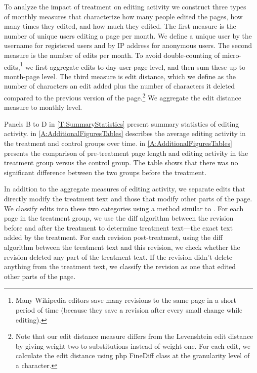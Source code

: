\documentclass[12pt]{article}
\begin{document}
To analyze the impact of treatment on editing activity we construct three types of monthly measures that characterize how many people edited the pages, how many times they edited, and how much they edited. The first measure is the number of unique users editing a page per month. We define a unique user by the username for registered users and by IP address for anonymous users. The second measure is the number of edits per month. To avoid double-counting of micro-edits,\footnote{Many Wikipedia editors save many revisions to the same page in a short period of time (because they save a revision after every small change while editing).} we first aggregate edits to day-user-page level, and then sum these up to month-page level.
The third measure is edit distance, which we define as the number of characters an edit added plus the number of characters it deleted compared to the previous version of the page.\footnote{Note that our edit distance measure differs from the Levenshtein edit distance by giving weight two to substitutions instead of weight one. For each edit, we calculate the edit distance using php FineDiff class at the granularity level of a character.} We aggregate the edit distance measure to monthly level.

Panels B to D in \cref{T:SummaryStatistics} present summary statistics of editing activity.
 in \cref{A:AdditionalFiguresTables}  describes the average editing activity in the treatment and control groups over time.  in \cref{A:AdditionalFiguresTables} presents the comparison of pre-treatment page length and editing activity in the treatment group versus the control group. The table shows that there was no significant difference between the two groups before the treatment.

In addition to the aggregate measures of editing activity, we separate edits that directly modify the treatment text and those that modify other parts of the page. We classify edits into these two categories using a method similar to \cite{hinnosaar2017wikipedia}. 
For each page in the treatment group, we use the diff algorithm between the revision before and after the treatment to determine treatment text---the exact text added by the treatment.
For each revision post-treatment, using the diff algorithm between the treatment text and this revision, we check whether the revision deleted any part of the treatment text. If the revision didn't delete anything from the treatment text, we classify the revision as one that edited other parts of the page.
\end{document}
